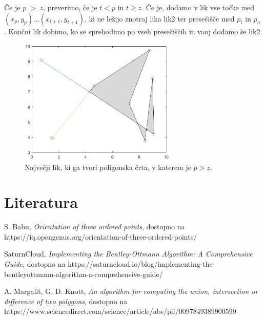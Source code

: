 \documentclass{article}
\begin{document}
Če je $p \; > \; z$, preverimo, če je $t < p$ in $t \geq z$. Če je, dodamo v lik vse točke
med $(x_{p}, y_{p}) \dots (x_{t+1}, y_{t+1})$, ki ne ležijo znotraj lika lik2 ter presečišče med $p_t$ in $p_n$.
Končni lik dobimo, ko se sprehodimo po vseh presečiščih in vanj dodamo še lik2.

\begin{figure}[H]
    \centering
        \includegraphics[height = 6cm]{seka2.eps}
        \caption{Največji lik, ki ga tvori poligonska črta, v katerem je $p > z$.}
\end{figure}



\section*{Literatura}

S. Babu, \emph{Orientation of three ordered points}, dostopno na https://iq.opengenus.org/orientation-of-three-ordered-points/

SaturnCloud, \emph{Implementing the Bentley-Ottmann Algorithm: A Comprehensive Guide}, dostopno na https://saturncloud.io/blog/implementing-the-bentleyottmann-algorithm-a-comprehensive-guide/

A. Margalit, G. D. Knott, \emph{An algorithm for computing the union, intersection or difference of two polygons}, dostopno na https://www.sciencedirect.com/science/article/abs/pii/0097849389900599
\end{document}
